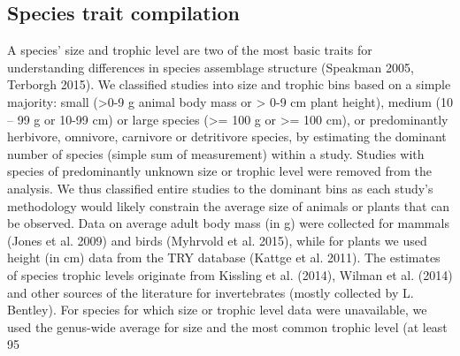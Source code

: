 {\subsection{Species trait compilation}
A species’ size and trophic level are two of the most basic traits for understanding differences in species assemblage structure (Speakman 2005, Terborgh 2015). We classified studies into size and trophic bins based on a simple majority: small (>0-9 g animal body mass or > 0-9 cm plant height), medium (10 – 99 g or 10-99 cm) or large species (>= 100 g or >= 100 cm), or predominantly herbivore, omnivore, carnivore or detritivore species, by estimating the dominant number of species (simple sum of measurement) within a study. Studies with species of predominantly unknown size or trophic level were removed from the analysis. We thus classified entire studies to the dominant bins as each study’s methodology would likely constrain the average size of animals or plants that can be observed. Data on average adult body mass (in g) were collected for mammals (Jones et al. 2009) and birds (Myhrvold et al. 2015), while for plants we used height (in cm) data from the TRY database (Kattge et al. 2011). The estimates of species trophic levels originate from Kissling et al. (2014), Wilman et al. (2014) and other sources of the literature for invertebrates (mostly collected by L. Bentley). For species for which size or trophic level data were unavailable, we used the genus-wide average for size and the most common trophic level (at least 95 %

}
